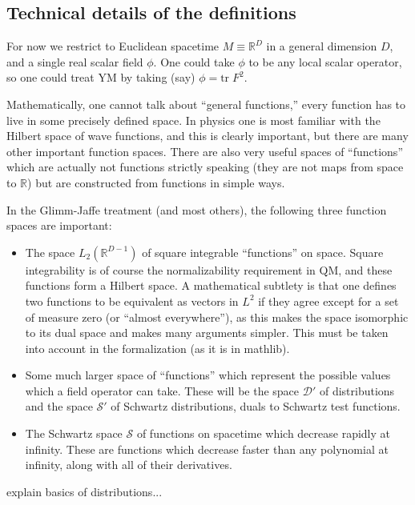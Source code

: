 \documentclass{article}
\newcommand{\1}{\mathbbm{1}}
\theoremstyle{plain}
\theoremstyle{definition}
\numberwithin{equation}{section}
\def\IR{\mathbb{R}}
\def\tr{\mbox{tr}\;}
\newcommand{\cD}{\mathcal D}
\newcommand{\cS}{\mathcal S}
\begin{document}
\subsection{Technical details of the definitions}

For now we restrict to Euclidean spacetime $M \equiv \IR^D$ in a general dimension $D$, and a single real scalar field $\phi$.
One could take $\phi$ to be any local scalar operator, so one could treat YM by taking (say) $\phi=\tr F^2$.

Mathematically, one cannot talk about ``general functions,'' every function has to live in some precisely defined space.  
In physics one is most familiar with the Hilbert space of wave functions, and this is clearly important, but
there are many other important function spaces.  There are also very useful spaces of ``functions'' which are actually
not functions strictly speaking (they are not maps from space to $\IR$) but are constructed from functions in simple ways.

In the Glimm-Jaffe treatment (and most others), the following three function spaces are important:
\begin{itemize}
    \item The space $L_2(\IR^{D-1})$ of square integrable ``functions'' on space.  Square integrability
    is of course the normalizability requirement in QM, and these functions form a Hilbert space.
    A mathematical subtlety is that one defines two functions to be equivalent as vectors in $L^2$ if they
    agree except for a set of measure zero (or ``almost everywhere''), as this makes the space isomorphic to its dual space and makes
    many arguments simpler.  This must be taken into account in the formalization (as it is in mathlib).
    \item Some much larger space of ``functions'' which represent the possible values which a field operator can take.
    These will be the space $\cD'$ of distributions and the space $\cS'$ of Schwartz distributions, duals to Schwartz test functions.
    \item The Schwartz space $\cS$ of functions on spacetime which decrease rapidly at infinity.
    These are functions which decrease faster than any polynomial at infinity, along with all of their derivatives.
\end{itemize}

explain basics of distributions...
\end{document}

